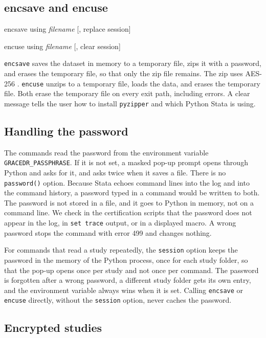 \documentclass[bib]{statapress}
\begin{document}
\subsection{encsave and encuse}

\begin{stlog}
encsave using \emph{filename} [, replace session]

encuse using \emph{filename} [, clear session]
\end{stlog}

\noindent \texttt{encsave} saves the dataset in memory to a temporary file,
zips it with a password, and erases the temporary file, so that only the zip file
remains. The zip uses AES-256 \citep{fips197}. \texttt{encuse} unzips to a
temporary file, loads the data, and erases the temporary file. Both erase the
temporary file on every exit path, including errors. A clear message tells the user how to
install \texttt{pyzipper} and which Python Stata is using.

\subsection{Handling the password}

The commands read the password from the environment variable
\texttt{GRACEDR\_PASSPHRASE}. If it is not set, a masked pop-up prompt opens
through Python and asks for it, and asks twice when it saves a file. There is
no \texttt{password()} option. Because Stata echoes command lines into the log and into
the command history, a password typed in a command would be written to
both. The password is not stored in a file, and it goes to Python in memory, not
on a command line. We check in the certification scripts that the password does
not appear in the log, in \texttt{set trace} output, or in a displayed macro. A
wrong password stops the command with error 499 and changes nothing.

For commands that read a study repeatedly, the \texttt{session} option keeps
the password in the memory of the Python process, once for each study folder, so
that the pop-up opens once per study and not once per command. The password is
forgotten after a wrong password, a different study folder gets its own entry,
and the environment variable always wins when it is set. Calling \texttt{encsave}
or \texttt{encuse} directly, without the \texttt{session} option, never caches the
password.

\subsection{Encrypted studies}
\end{document}
